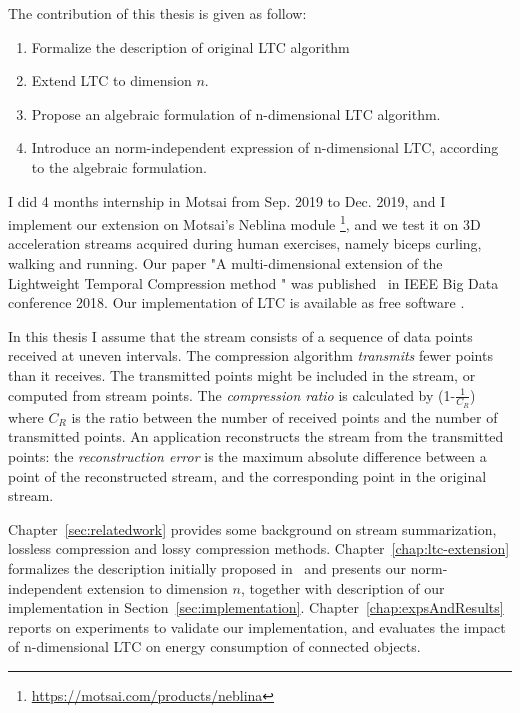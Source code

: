 
The contribution of this thesis is given as follow:
\begin{enumerate}
  \item Formalize the description of original LTC algorithm
  \item Extend LTC to dimension $n$.
  \item Propose an algebraic formulation of n-dimensional LTC algorithm.
  \item Introduce an norm-independent expression of n-dimensional LTC, according to
  the algebraic formulation.
\end{enumerate}


I did 4 months internship in Motsai from Sep. 2019 to Dec. 2019, and I implement
our extension on  Motsai's Neblina module
\footnote{\url{https://motsai.com/products/neblina}}, and we test it on 3D
acceleration streams acquired during human exercises, namely biceps curling,
walking and  running. Our paper "A multi-dimensional extension of the
Lightweight Temporal Compression method " was published~\cite{li2018multi} in
IEEE Big Data conference 2018. Our implementation of LTC is available as free
software .



In this thesis I assume that the stream consists of a sequence of data points
received at uneven intervals. The compression algorithm  \emph{transmits} fewer
points than it receives. The transmitted points  might be included in the
stream, or computed from stream points. The  \emph{compression ratio} is
calculated by (1-$\frac{1}{C_R}$) where $C_R$ is the ratio between the number of
received points and the number of transmitted points. An application
reconstructs the stream from the transmitted points: the  \emph{reconstruction
error} is the maximum absolute difference between  a point of the reconstructed
stream, and the corresponding  point in the original stream.


Chapter~\ref{sec:relatedwork} provides some background on stream summarization,
lossless compression and lossy compression methods.
Chapter~\ref{chap:ltc-extension} formalizes the description initially proposed
in~\cite{schoellhammer2004lightweight} and presents our norm-independent
extension to dimension $n$, together with description of our implementation in
Section~\ref{sec:implementation}. Chapter~\ref{chap:expsAndResults} reports on
experiments to validate our  implementation, and evaluates the impact of
n-dimensional LTC on  energy consumption of connected objects.





